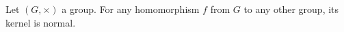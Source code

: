 Let $(G, \times)$ a group.
For any homomorphism $f$ from $G$ to any other group, its kernel is normal.